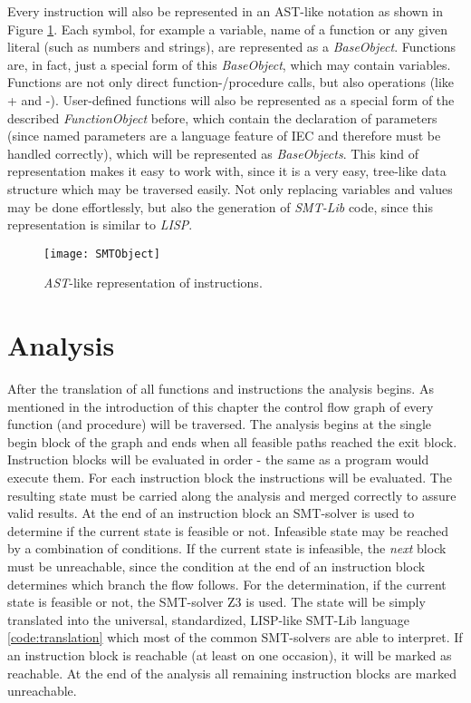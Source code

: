 Every instruction will also be represented in an AST-like notation as shown in Figure \ref{fig:smtobject}. Each symbol, for example a variable, name of a function or any given literal (such as numbers and strings), are represented as a \emph{BaseObject}. Functions are, in fact, just a special form of this \emph{BaseObject}, which may contain variables. Functions are not only direct function-/procedure calls, but also operations (like + and -). User-defined functions will also be represented as a special form of the described \emph{FunctionObject} before, which contain the declaration of parameters (since named parameters are a language feature of IEC and therefore must be handled correctly), which will be represented as \emph{BaseObjects}. 
This kind of representation makes it easy to work with, since it is a very easy, tree-like data structure which may be traversed easily. Not only replacing variables and values may be done effortlessly, but also the generation of \emph{SMT-Lib} code, since this representation is similar to \emph{LISP}.

\begin{figure}
	\centering
	\texttt{[image: SMTObject]}
	\caption{\emph{AST}-like representation of instructions. }
	\label{fig:smtobject}
\end{figure}
\section{Analysis}
\label{sec:analysis}
After the translation of all functions and instructions the analysis begins. As mentioned in the introduction of this chapter the control flow graph of every function (and procedure) will be traversed. The analysis begins at the single begin block of the graph and ends when all feasible paths reached the exit block. Instruction blocks will be evaluated in order - the same as a program would execute them. 
For each instruction block the instructions will be evaluated. The resulting state must be carried along the analysis and merged correctly to assure valid results. At the end of an instruction block an SMT-solver is used to determine if the current state is feasible or not. Infeasible state may be reached by a combination of conditions. If the current state is infeasible, the \emph{next} block must be unreachable, since the condition at the end of an instruction block determines which branch the flow follows. 
For the determination, if the current state is feasible or not, the SMT-solver Z3 \cite{demouraZ3EfficientSMT2008} is used. The state will be simply translated into the universal, standardized, LISP-like SMT-Lib language \ref{code:translation} which most of the common SMT-solvers are able to interpret. 
If an instruction block is reachable (at least on one occasion), it will be marked as reachable. At the end of the analysis all remaining instruction blocks are marked unreachable.


